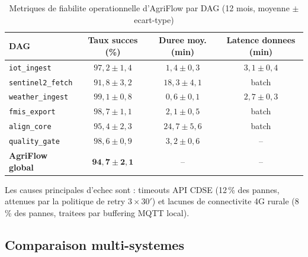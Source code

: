 \documentclass[12pt,a4paper]{article}
\theoremstyle{plain}
\theoremstyle{definition}
\theoremstyle{remark}
\begin{document}
\begin{table}[H]
\caption{Metriques de fiabilite operationnelle d'AgriFlow par DAG
         (12 mois, moyenne $\pm$ ecart-type)}
\label{tab:reliability}
\centering\small
\renewcommand{\arraystretch}{1.38}
\begin{tabularx}{\linewidth}{Xccc}
\toprule
\textbf{DAG} & \textbf{Taux succes (\%)} &
\textbf{Duree moy. (min)} & \textbf{Latence donnees (min)} \\
\midrule
\rowcolor{lightblue!30}
\texttt{iot\_ingest}      & $97{,}2 \pm 1{,}4$ & $1{,}4 \pm 0{,}3$ & $3{,}1 \pm 0{,}4$ \\
\texttt{sentinel2\_fetch} & $91{,}8 \pm 3{,}2$ & $18{,}3 \pm 4{,}1$ & batch \\
\rowcolor{lightblue!30}
\texttt{weather\_ingest}  & $99{,}1 \pm 0{,}8$ & $0{,}6 \pm 0{,}1$ & $2{,}7 \pm 0{,}3$ \\
\texttt{fmis\_export}     & $98{,}7 \pm 1{,}1$ & $2{,}1 \pm 0{,}5$ & batch \\
\rowcolor{lightblue!30}
\texttt{align\_core}      & $95{,}4 \pm 2{,}3$ & $24{,}7 \pm 5{,}6$ & batch \\
\texttt{quality\_gate}    & $98{,}6 \pm 0{,}9$ & $3{,}2 \pm 0{,}6$ & -- \\
\midrule
\rowcolor{lightgreen!50}
\textbf{AgriFlow global}  & $\mathbf{94{,}7 \pm 2{,}1}$ & -- & -- \\
\bottomrule
\end{tabularx}
\end{table}

Les causes principales d'echec sont : timeouts API CDSE (12\,\% des
pannes, attenues par la politique de retry $3\times30'$) et lacunes de
connectivite 4G rurale (8\,\% des pannes, traitees par buffering MQTT local).

\subsection{Comparaison multi-systemes}
\end{document}
